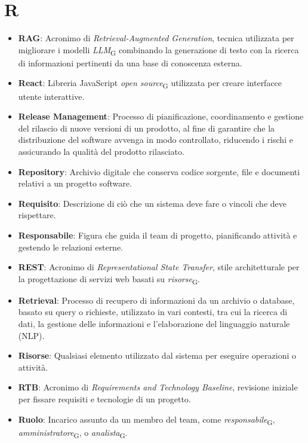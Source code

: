 \section*{R}  
\begin{itemize}
\item \textbf{RAG}: Acronimo di \textit{Retrieval-Augmented Generation}, tecnica utilizzata per migliorare i modelli 
\textit{LLM}\textsubscript{G} combinando la generazione di testo con la ricerca di informazioni pertinenti da una base di conoscenza esterna. 
\item \textbf{React}: Libreria JavaScript \textit{open source}\textsubscript{G} utilizzata per creare interfacce utente interattive. 
\item \textbf{Release Management}: Processo di pianificazione, coordinamento e gestione del rilascio di nuove versioni di un prodotto, al fine di garantire che la distribuzione del software avvenga in modo controllato, riducendo i rischi e assicurando la qualità del prodotto rilasciato.
\item \textbf{Repository}: Archivio digitale che conserva codice sorgente, file e documenti relativi a un progetto software.
\item \textbf{Requisito}: Descrizione di ciò che un sistema deve fare o vincoli che deve rispettare.
\item \textbf{Responsabile}: Figura che guida il team di progetto, pianificando attività e gestendo le relazioni esterne.
\item \textbf{REST}: Acronimo di \textit{Representational State Transfer}, stile architetturale per la progettazione di servizi web basati su \textit{risorse}\textsubscript{G}.
\item \textbf{Retrieval}: Processo di recupero di informazioni da un archivio o database, basato su query o richieste, utilizzato in vari contesti, tra cui la ricerca di dati, la gestione delle informazioni e l'elaborazione del linguaggio naturale (NLP).
\item \textbf{Risorse}: Qualsiasi elemento utilizzato dal sistema per eseguire operazioni o attività.
\item \textbf{RTB}: Acronimo di \textit{Requirements and Technology Baseline}, revisione iniziale per fissare requisiti e tecnologie di un progetto.
\item \textbf{Ruolo}: Incarico assunto da un membro del team, come \textit{responsabile}\textsubscript{G}, \textit{amministratore}\textsubscript{G}, o \textit{analista}\textsubscript{G}.
\end{itemize}